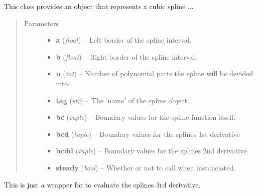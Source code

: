 \documentclass[letterpaper,10pt,english]{sphinxmanual}
\begin{document}
\begin{fulllineitems}
\label{pytrajectory:pytrajectory.spline.CubicSpline}
This class provides an object that represents a cubic spline ...
\begin{quote}\begin{description}
\item[{Parameters}] \leavevmode\begin{itemize}
\item {} 
\textbf{a} (\emph{float}) -- Left border of the spline interval.

\item {} 
\textbf{b} (\emph{float}) -- Right border of the spline interval.

\item {} 
\textbf{n} (\emph{int}) -- Number of polynomial parts the spline will be devided into.

\item {} 
\textbf{tag} (\emph{str}) -- The `name' of the spline object.

\item {} 
\textbf{bc} (\emph{tuple}) -- Boundary values for the spline function itself.

\item {} 
\textbf{bcd} (\emph{tuple}) -- Boundary values for the splines 1st derivative

\item {} 
\textbf{bcdd} (\emph{tuple}) -- Boundary values for the splines 2nd derivative

\item {} 
\textbf{steady} (\emph{bool}) -- Whether or not to call {\hyperref[pytrajectory:pytrajectory.spline.CubicSpline.makesteady]{}} when instanciated.

\end{itemize}

\end{description}\end{quote}

\begin{fulllineitems}
\label{pytrajectory:pytrajectory.spline.CubicSpline.dddf}
This is just a wrapper for {\hyperref[pytrajectory:pytrajectory.spline.CubicSpline.evalf]{}} to evaluate the splines 3rd derivative.


\end{fulllineitems}
\end{fulllineitems}
\end{document}
